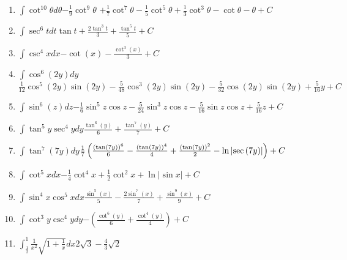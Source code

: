 {\begin{enumerate}
\item {$\displaystyle\int \cot ^{10}\theta d\theta$}{$-\frac{1}{9}\cot ^{9}\theta$ \linebreak $+\frac{1}{7}\cot ^{7}\theta -\frac{1}{5}\cot ^{5}\theta +\frac{1}{3}\cot^{3}\theta -\cot \theta -\theta +C$}

\item {$\displaystyle\int \sec ^{6}tdt$}{$\tan t+\frac{2\tan ^{3}t}{3}+\frac{\tan	^{5}t}{5}+C$}

\item {$\displaystyle\int \csc ^{4}xdx$}{$-\cot \left( x\right) -\frac{\cot	^{3}\left( x\right) }{3}+C$}

\item {$\displaystyle\int \cos ^{6}(2y)dy$}{$\frac{1}{12}\cos ^{5}\left( 2y\right) \sin \left( 2y\right) -\frac{5}{48}%
\cos ^{3}\left( 2y\right) \sin \left( 2y\right) -\frac{5}{32}\cos \left(
2y\right) \sin \left( 2y\right) +\frac{5}{16}y+C$}

\item {$\displaystyle\int \sin ^{6}(z)dz$}{$-\frac{1}{6}\sin ^{5}z\cos z-\frac{5}{24}\sin ^{3}z\cos z-\frac{5}{16}\sin
z\cos z+\frac{5}{16}z+C$}

\item {$\displaystyle\int \tan ^{5}y\sec ^{4}ydy$}{$\frac{\tan ^{6}\left( y\right)}{6}+\frac{\tan ^{7}\left( y\right) }{7}+C$}

\item {$\displaystyle\int \tan ^{7}\left( 7y\right) dy$}{$\frac{1}{7}\left( \frac{\left( \tan \left( 7y\right) \right) ^{6}}{6}-\frac{%
\left( \tan \left( 7y\right) \right) ^{4}}{4}+\frac{\left( \tan \left(
7y\right) \right) ^{2}}{2}-\ln \left\vert \sec \left( 7y\right) \right\vert
\right) +C$}

\item {$\displaystyle\int \cot ^{5}xdx$}{$-\frac{1}{4}\cot ^{4}x+\frac{1}{2}\cot^{2}x+\ln \left\vert \sin x\right\vert +C$}

\item {$\displaystyle\int \sin ^{4}x\cos ^{5}xdx$}{$\frac{\sin ^{5}\left( x\right)}{5}-\frac{2\sin ^{7}\left( x\right) }{7}+\frac{\sin ^{9}\left( x\right) }{9}+C$}

\item {$\displaystyle\int \cot ^{3}y\csc ^{4}ydy$}{$-\left( \frac{\cot ^{6}\left( y\right) }{6}+\frac{\cot ^{4}\left( y\right) 
}{4}\right) +C$}

\item {$\displaystyle\int_{\frac{1}{2}}^{1}\frac{1}{x^{2}}\sqrt{1+\frac{1}{x}}dx$}{$2\sqrt{3}-\frac{4}{3}\sqrt{2}$}


\end{enumerate}}
